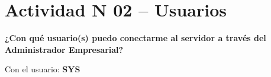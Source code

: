 \section{Actividad N 02 – Usuarios} 
\textbf{¿Con qué usuario(s) puedo conectarme al servidor a través del Administrador
Empresarial?}\\
\begin{flushleft}
Con el usuario: \textbf{SYS}\\
\end{flushleft}